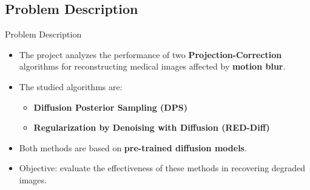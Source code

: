 \subsection{Problem Description}
\begin{frame}{Problem Description}
  \begin{itemize}
    \item The project analyzes the performance of two \textbf{Projection-Correction} algorithms for reconstructing medical images affected by \textbf{motion blur}.
    \item The studied algorithms are:
    \begin{itemize}
      \item \textbf{Diffusion Posterior Sampling (DPS)}
      \item \textbf{Regularization by Denoising with Diffusion (RED-Diff)}
    \end{itemize}
    \item Both methods are based on \textbf{pre-trained diffusion models}.
    \item Objective: evaluate the effectiveness of these methods in recovering degraded images.
  \end{itemize}
\end{frame}